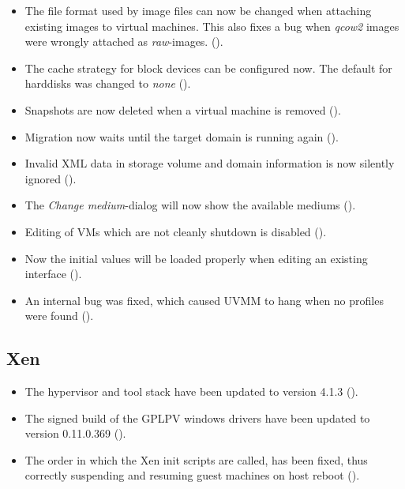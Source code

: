 \begin{itemize}
\item The file format used by image files can now be changed when
  attaching existing images to virtual machines. This also fixes a bug
  when \emph{qcow2} images were wrongly attached as
  \emph{raw}-images. ().

\item The cache strategy for block devices can be configured now. The
  default for harddisks was changed to \emph{none} ().

\item Snapshots are now deleted when a virtual machine is removed
  ().

\item Migration now waits until the target domain is running again
  ().

\item Invalid XML data in storage volume and domain information is now
  silently ignored ().

\item The \emph{Change medium}-dialog will now show the available
  mediums ().

\item Editing of VMs which are not cleanly shutdown is disabled ().

\item Now the initial values will be loaded properly when editing an
  existing interface ().
\item An internal bug was fixed, which caused UVMM to hang when no profiles were found ().
\end{itemize}

\subsection{Xen}
\begin{itemize}
\item The  hypervisor and tool stack have been updated to
  version 4.1.3 ().

\item The signed build of the GPLPV windows drivers have been updated
  to version 0.11.0.369 ().

\item The order in which the Xen init scripts are called, has been
  fixed, thus correctly suspending and resuming guest machines on host reboot ().
\end{itemize}

